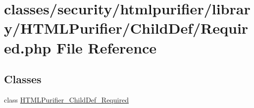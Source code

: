 \hypertarget{Required_8php}{\section{classes/security/htmlpurifier/library/\+H\+T\+M\+L\+Purifier/\+Child\+Def/\+Required.php File Reference}
\label{Required_8php}
}
\subsection*{Classes}
\begin{DoxyCompactItemize}
\item 
class \hyperlink{classHTMLPurifier__ChildDef__Required}{H\+T\+M\+L\+Purifier\+\_\+\+Child\+Def\+\_\+\+Required}
\end{DoxyCompactItemize}
